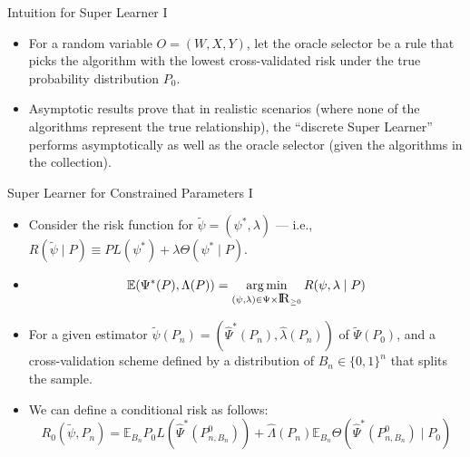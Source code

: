 \documentclass[12pt,t,handout]{beamer}
\newcommand{\E}{\mathbb{E}}
\DeclareMathOperator*{\argmin}{arg\,min}
\newcommand{\openr}{\hbox{${\rm I\kern-.2em R}$}}
\begin{document}

\begin{frame}[c]{Intuition for Super Learner I}

\begin{center}
\begin{itemize}
  \itemsep12pt
  \item For a random variable $O = (W,X,Y)$, let the oracle selector be a rule
    that picks the algorithm with the lowest cross-validated risk under the true
    probability distribution $P_0$.
  \item Asymptotic results prove that in realistic scenarios (where none of the
    algorithms represent the true relationship), the ``discrete Super Learner''
    performs asymptotically as well as the oracle selector (given the algorithms
    in the collection).
\end{itemize}
\end{center}

\note{
}

\end{frame}


\begin{frame}[c]{Super Learner for Constrained Parameters I}

\begin{center}
\begin{itemize}
  \itemsep12pt
  \item Consider the risk function for $\widetilde{\psi} = (\psi^*, \lambda)$
    --- i.e., $R(\tilde{\psi} \mid P) \equiv PL(\psi^*) + \lambda \Theta(\psi^*
    \mid P)$.
  \item $$\E(\Psi^*(P), \Lambda(P)) = \argmin_{(\psi, \lambda) \in \Psi
      \times \openr_{\geq 0}}R(\psi, \lambda \mid P)$$
  \item For a given estimator $\widetilde{\psi}(P_n) = (\hat{\Psi}^*(P_n),
    \hat{\lambda}(P_n))$ of $\widetilde{\Psi}(P_0)$, and a cross-validation
    scheme defined by a distribution of $B_n \in \{0, 1\}^n$ that splits the
    sample.
  \item We can define a conditional risk as follows:
    $$R_0(\widetilde{\psi}, P_n) = \E_{B_n} P_0L(\hat{\Psi}^*(P_{n, B_n}^0)) +
      \hat{\Lambda}(P_n) \E_{B_n} \Theta(\hat{\Psi}^*(P_{n, B_n}^0) \mid P_0)$$
\end{itemize}
\end{center}


\end{frame}
\end{document}
